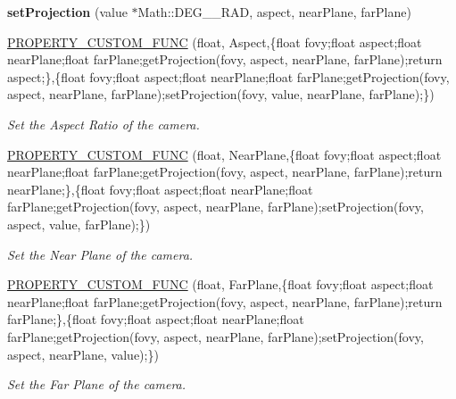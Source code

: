 \begin{DoxyCompactItemize}
\item 
{\bfseries set\+Projection} (value $\ast$Math\+::\+D\+E\+G\+\_\+\_\+\+R\+AD, aspect, near\+Plane, far\+Plane)\hypertarget{class_magnum_1_1_perspective_camera_component_ae73c4ec5199a3952d78d8a9b9c5686f2}{}\label{class_magnum_1_1_perspective_camera_component_ae73c4ec5199a3952d78d8a9b9c5686f2}

\item 
\hyperlink{class_magnum_1_1_perspective_camera_component_a917ebee85b2f26f9d368b91cab1901ee}{P\+R\+O\+P\+E\+R\+T\+Y\+\_\+\+C\+U\+S\+T\+O\+M\+\_\+\+F\+U\+NC} (float, Aspect,\{float fovy;float aspect;float near\+Plane;float far\+Plane;get\+Projection(fovy, aspect, near\+Plane, far\+Plane);return aspect;\},\{float fovy;float aspect;float near\+Plane;float far\+Plane;get\+Projection(fovy, aspect, near\+Plane, far\+Plane);set\+Projection(fovy, value, near\+Plane, far\+Plane);\})
\begin{DoxyCompactList}\small\item\em Set the Aspect Ratio of the camera. \end{DoxyCompactList}\item 
\hyperlink{class_magnum_1_1_perspective_camera_component_af93a29865e82c2b3f525cd2f60742058}{P\+R\+O\+P\+E\+R\+T\+Y\+\_\+\+C\+U\+S\+T\+O\+M\+\_\+\+F\+U\+NC} (float, Near\+Plane,\{float fovy;float aspect;float near\+Plane;float far\+Plane;get\+Projection(fovy, aspect, near\+Plane, far\+Plane);return near\+Plane;\},\{float fovy;float aspect;float near\+Plane;float far\+Plane;get\+Projection(fovy, aspect, near\+Plane, far\+Plane);set\+Projection(fovy, aspect, value, far\+Plane);\})
\begin{DoxyCompactList}\small\item\em Set the Near Plane of the camera. \end{DoxyCompactList}\item 
\hyperlink{class_magnum_1_1_perspective_camera_component_a28d77a10a74dcd21143691b0599f4b56}{P\+R\+O\+P\+E\+R\+T\+Y\+\_\+\+C\+U\+S\+T\+O\+M\+\_\+\+F\+U\+NC} (float, Far\+Plane,\{float fovy;float aspect;float near\+Plane;float far\+Plane;get\+Projection(fovy, aspect, near\+Plane, far\+Plane);return far\+Plane;\},\{float fovy;float aspect;float near\+Plane;float far\+Plane;get\+Projection(fovy, aspect, near\+Plane, far\+Plane);set\+Projection(fovy, aspect, near\+Plane, value);\})
\begin{DoxyCompactList}\small\item\em Set the Far Plane of the camera. \end{DoxyCompactList}\item 

\end{DoxyCompactItemize}
